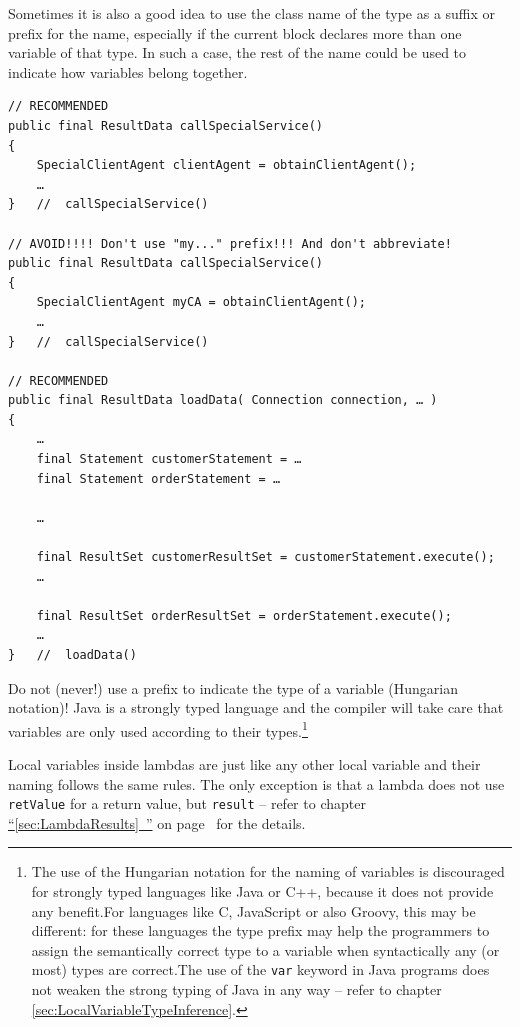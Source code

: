 \documentclass[11pt,a4paper, titlepage, parskip=half, headsepline, footsepline, cleardoublepage=current, headheight=1cm]{scrbook}
\newcommand*{\tqfullvref}[1]{\hyperref[{#1}]{“\ref*{#1}~\nameref*{#1}”} on page~\pageref{#1}}
\begin{document}
Sometimes it is also a good idea to use the class name of the type as a suffix or prefix for the name, especially if the current block declares more than one variable of that type. In such a case, the rest of the name could be used to indicate how variables belong together.
\begin{lstlisting}
// RECOMMENDED
public final ResultData callSpecialService()
{
    SpecialClientAgent clientAgent = obtainClientAgent();
    …
}   //  callSpecialService()

// AVOID!!!! Don't use "my..." prefix!!! And don't abbreviate!
public final ResultData callSpecialService()
{
    SpecialClientAgent myCA = obtainClientAgent();
    …
}   //  callSpecialService()

// RECOMMENDED
public final ResultData loadData( Connection connection, … )
{
    …
    final Statement customerStatement = …
    final Statement orderStatement = …

    …

    final ResultSet customerResultSet = customerStatement.execute();
    …

    final ResultSet orderResultSet = orderStatement.execute();
    …
}   //  loadData()
\end{lstlisting}

Do not (never!) use a prefix to indicate the type of a variable (Hungarian notation)! Java is a strongly typed language and the compiler will take care that variables are only used according to their types.\footnote{The use of the Hungarian notation for the naming of variables is discouraged for strongly typed languages like Java or C++, because it does not provide any benefit.\newline For languages like C, JavaScript or also Groovy, this may be different: for these languages the type prefix may help the programmers to assign the semantically correct type to a variable when syntactically any (or most) types are correct.\newline The use of the \lstinline|var| keyword in Java programs does not weaken the strong typing of Java in any way – refer to chapter \ref{sec:LocalVariableTypeInference}.}

Local variables inside lambdas are just like any other local variable and their naming follows the same rules. The only exception is that a lambda does not use \lstinline|retValue| for a return value, but \lstinline|result| – refer to chapter \tqfullvref{sec:LambdaResults} for the details.

\end{document}
